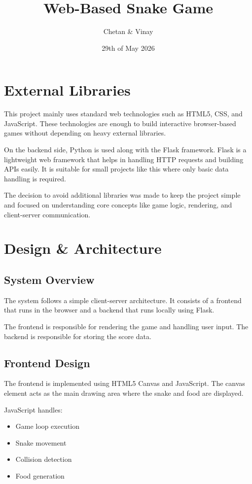 \documentclass[12pt, a4paper]{article}
\title{Web-Based Snake Game}
\author{Chetan \& Vinay}
\date{29th of May 2026}
\begin{document}
\maketitle

\section{External Libraries}
This project mainly uses standard web technologies such as HTML5, CSS, and JavaScript. These technologies are enough to build interactive browser-based games without depending on heavy external libraries.

On the backend side, Python is used along with the Flask framework. Flask is a lightweight web framework that helps in handling HTTP requests and building APIs easily. It is suitable for small projects like this where only basic data handling is required.

The decision to avoid additional libraries was made to keep the project simple and focused on understanding core concepts like game logic, rendering, and client-server communication.

\section{Design \& Architecture}

\subsection{System Overview}
The system follows a simple client-server architecture. It consists of a frontend that runs in the browser and a backend that runs locally using Flask.

The frontend is responsible for rendering the game and handling user input. The backend is responsible for storing the score data.

\subsection{Frontend Design}
The frontend is implemented using HTML5 Canvas and JavaScript. The canvas element acts as the main drawing area where the snake and food are displayed.

JavaScript handles:
\begin{itemize}
    \item Game loop execution
    \item Snake movement
    \item Collision detection
    \item Food generation
\end{itemize}
\end{document}
